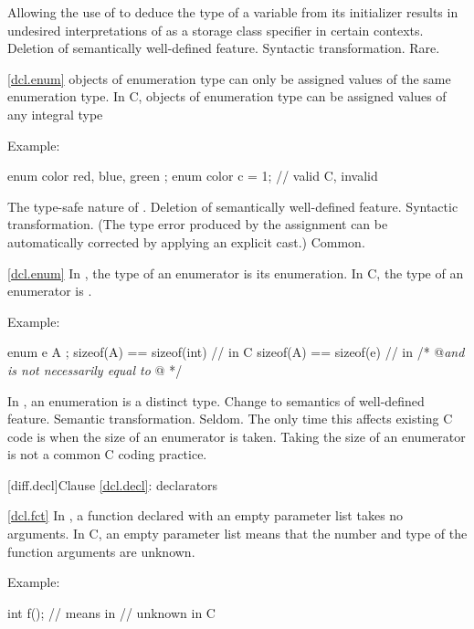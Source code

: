 \rationale Allowing the use of  to deduce the type
of a variable from its initializer results in undesired interpretations of
 as a storage class specifier in certain contexts.
\effect Deletion of semantically well-defined feature.
\difficulty Syntactic transformation.
\howwide Rare.

\ref{dcl.enum}
\change \Cpp objects of enumeration type can only be assigned values of the same enumeration type.
In C, objects of enumeration type can be assigned values of any integral type

Example:
\begin{codeblock}
enum color { red, blue, green };
enum color c = 1;               // valid C, invalid \Cpp
\end{codeblock}

\rationale
The type-safe nature of \Cpp.
\effect
Deletion of semantically well-defined feature.
\difficulty
Syntactic transformation.
(The type error produced by the assignment can be automatically
corrected by applying an explicit cast.)
\howwide
Common.

\ref{dcl.enum}
\change In \Cpp, the type of an enumerator is its enumeration. In C, the type of an enumerator is .

Example:

\begin{codeblock}
enum e { A };
sizeof(A) == sizeof(int)        // in C
sizeof(A) == sizeof(e)          // in \Cpp
/* @\textit{\textrm{and  is not necessarily equal to }}@ */
\end{codeblock}

\rationale
In \Cpp, an enumeration is a distinct type.
\effect
Change to semantics of well-defined feature.
\difficulty
Semantic transformation.
\howwide
Seldom.
The only time this affects existing C code is when the size of an
enumerator is taken.
Taking the size of an enumerator is not a
common C coding practice.

[diff.decl]{Clause \ref{dcl.decl}: declarators}

\ref{dcl.fct}
\change In \Cpp, a function declared with an empty parameter list takes no arguments.
In C, an empty parameter list means that the number and type of the function arguments are unknown.

Example:

\begin{codeblock}
int f();            // means    in \Cpp
                    //  unknown \tcode{)} in C
\end{codeblock}


